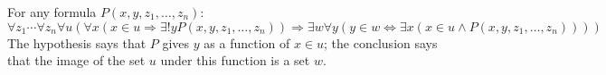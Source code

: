 For any formula $P(x, y, z_1, \ldots, z_n)$:
$$\forall z_1 \cdots \forall z_n \forall u (\forall x (x \in u \Rightarrow \exists!y P(x, y, z_1, \ldots, z_n)) \Rightarrow \exists w \forall y (y \in w \Leftrightarrow \exists x (x \in u \land P(x, y, z_1, \ldots, z_n))))$$
The hypothesis says that $P$ gives $y$ as a function of $x \in u$; the conclusion says that the image of the set $u$ under this function is a set $w$.
